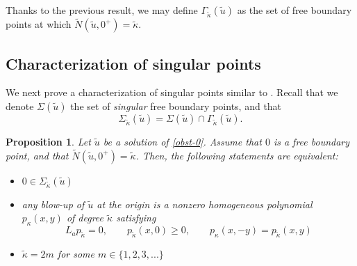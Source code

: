 \documentclass[11pt]{amsart}
\theoremstyle{plain}
\newtheorem{prop}[thrm]{Proposition}
\numberwithin{equation}{section}
\begin{document}
Thanks to the previous result, we may define $\Gamma_{\tilde \kappa}(\tilde u)$ as the set of free boundary points at which $\tilde N(\tilde u,0^+)=\tilde \kappa$.

\subsection{Characterization of singular points}

We next prove a characterization of singular points similar to \cite[Theorem 1.3.2]{GP}.
Recall that we denote $\Sigma(\tilde u)$ the set of \emph{singular} free boundary points, and that
\[
\Sigma_{\tilde \kappa}(\tilde u)=\Sigma(\tilde u)\cap\Gamma_{\tilde \kappa}(\tilde u).
\]

\begin{prop}\label{characterization}
Let $\tilde u$ be a solution of \eqref{obst-0}.
Assume that $0$ is a free boundary point, and that $\tilde N(\tilde u,0^+)=\tilde \kappa$.
Then, the following statements are equivalent:
\begin{itemize}
\item[(i)] $0\in \Sigma_{\tilde \kappa}(\tilde u)$
\item[(ii)] any blow-up of $\tilde u$ at the origin is a nonzero homogeneous polynomial $p_\kappa(x,y)$ of degree $\tilde \kappa$ satisfying
    \[L_ap_{\tilde \kappa}=0,\qquad p_{\tilde \kappa}(x,0)\geq0,\qquad p_\kappa(x,-y)=p_{\tilde \kappa}(x,y)\]
\item[(iii)] $\tilde \kappa=2m$ for some $m\in \{1,2,3,...\}$
\end{itemize}
\end{prop}
\end{document}
